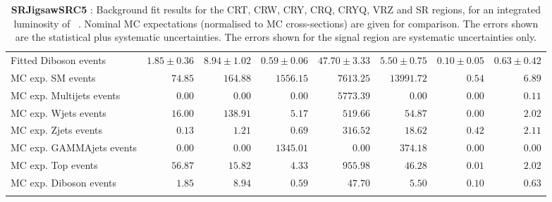 \begin{table}
\begin{center}
{\begin{tabular*}{\textwidth}{@{\extracolsep{\fill}}lrrrrrrr}
        Fitted Diboson events         & $1.85 \pm 0.36$          & $8.94 \pm 1.02$          & $0.59 \pm 0.06$          & $47.70 \pm 3.33$          & $5.50 \pm 0.75$          & $0.10 \pm 0.05$          & $0.63 \pm 0.42$              \\
 \noalign{\smallskip}\hline\noalign{\smallskip}
MC exp. SM events              & $74.85$          & $164.88$          & $1556.15$          & $7613.25$          & $13991.72$          & $0.54$          & $6.89$              \\
\noalign{\smallskip}\hline\noalign{\smallskip}
        MC exp. Multijets events         & $0.00$          & $0.00$          & $0.00$          & $5773.39$          & $0.00$          & $0.00$          & $0.11$              \\
        MC exp. Wjets events         & $16.00$          & $138.91$          & $5.17$          & $519.66$          & $54.87$          & $0.00$          & $2.02$              \\
        MC exp. Zjets events         & $0.13$          & $1.21$          & $0.69$          & $316.52$          & $18.62$          & $0.42$          & $2.11$              \\
        MC exp. GAMMAjets events         & $0.00$          & $0.00$          & $1345.01$          & $0.00$          & $374.18$          & $0.00$          & $0.00$              \\
        MC exp. Top events         & $56.87$          & $15.82$          & $4.33$          & $955.98$          & $46.28$          & $0.01$          & $2.02$              \\
        MC exp. Diboson events         & $1.85$          & $8.94$          & $0.59$          & $47.70$          & $5.50$          & $0.10$          & $0.63$              \\
\noalign{\smallskip}\hline\noalign{\smallskip}
\end{tabular*}
}
\end{center}
\caption{{\bf SRJigsawSRC5} : Background fit results for the CRT, CRW, CRY, CRQ, CRYQ, VRZ and SR regions, for an integrated luminosity of \ourintlumi~\ifb. Nominal MC expectations (normalised to MC cross-sections) are given for comparison. The errors shown are the statistical plus systematic uncertainties. The errors shown for the signal region are systematic uncertainties only.}
\label{table.results.systematics.in.logL.fit.CRT.CRW.CRY.CRQ.CRYQ.VRZ.SR.SRJigsawSRC5}
\end{table}
%